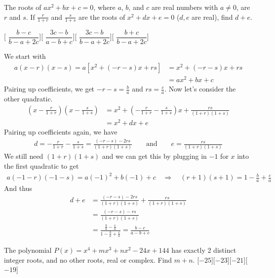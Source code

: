 \begin{problem}
    The roots of \( ax^2 + bx + c = 0 \), where \( a \), \( b \), and \( c \) are real numbers with \( a \neq 0 \), are \( r \) and \( s \). If \( \frac{r}{1+r} \) and \( \frac{s}{1+s} \) are the roots of \( x^2 + dx + e = 0 \) (\( d, e \) are real), find \( d + e \).
\end{problem}
[
    $\dfrac{b-c}{b-a+2c}$][
    $\dfrac{3c-b}{a-b+c}$][
    $\dfrac{3c-b}{b-a+2c}$][
    $\dfrac{b+c}{b-a+2c}$]

\begin{solution}[A]
    We start with
    \begin{align*}
          a(x-r)(x-s) = a[x^2+(-r-s)x+rs] &= x^2+(-r-s)x+rs\\
          &= ax^2+bx+c
    \end{align*}
    Pairing up coefficients, we get \(-r-s=\frac{b}{a}\) and \(rs=\frac{c}{a}\). Now let's consider the other quadratic.
    \begin{align*}
        \left(x-\frac{r}{1+r}\right)\left(x-\frac{s}{1+s}\right) &= x^2 + \left(-\frac{r}{1+r}-\frac{s}{1+s}\right)x + \frac{rs}{(1+r)(1+s)}\\
        &= x^2 + dx + e
    \end{align*}
    Pairing up coefficients again, we have
    \begin{align*}
        d = -\frac{r}{1+r}-\frac{s}{1+s} = \frac{(-r-s)-2rs}{(1+r)(1+s)} \qquad \text{and} \qquad e= \frac{rs}{(1+r)(1+s)}
    \end{align*}
    We still need \((1+r)(1+s)\) and we can get this by plugging in $-1$ for $x$ into the first quadratic to get
    \begin{align*}
        a(-1-r)(-1-s) = a(-1)^2+b(-1)+c \quad \Rightarrow \quad (r+1)(s+1) = 1 - \frac{b}{a} + \frac{c}{a}
    \end{align*}
    And thus
    \begin{align*}
        d+e &= \frac{(-r-s)-2rs}{(1+r)(1+s)} + \frac{rs}{(1+r)(1+s)}\\
        &= \frac{(-r-s)-rs}{(1+r)(1+s)}\\
        &= \frac{\frac{b}{a}-\frac{c}{a}}{1-\frac{b}{a}+\frac{c}{a}} = \boxed{\frac{b-c}{a-b+c}}
    \end{align*}
\end{solution}

\begin{problem}
   The polynomial \( P(x) = x^4 + mx^3 + nx^2 - 24x + 144 \) has exactly 2 distinct integer roots, and no other roots, real or complex. Find \( m + n \).
   [$-25$][$-23$][$-21$][$-19$]
   \end{problem}


